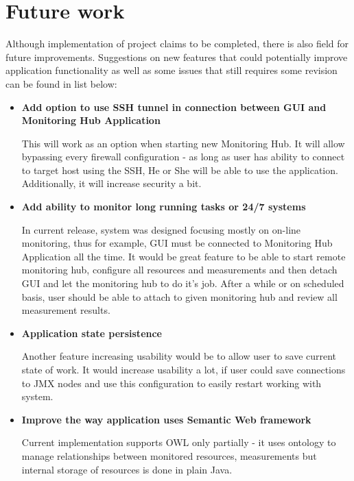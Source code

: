 %


\section{Future work}
\label{sec:ch8_future_work}
 
Although implementation of project claims to be completed, there is also field for future improvements. Suggestions on new features that could potentially improve application functionality as well as some issues that still requires some revision can be found in list below:

\begin{itemize}
 \item {\bf Add option to use SSH tunnel in connection between GUI and Monitoring Hub Application}
 
 This will work as an option when starting new Monitoring Hub. It will allow bypassing every firewall configuration - as long as user has ability to connect to target host using the SSH, He or She will be able to use the application. Additionally, it will increase security a bit.
 
\item {\bf Add ability to monitor long running tasks or 24/7 systems }  

In current release, system was designed focusing mostly on on-line monitoring, thus for example, GUI must be connected to Monitoring Hub Application all the time. It would be great feature to be able to start remote monitoring hub, configure all resources and measurements and then detach GUI and let the monitoring hub to do it\rq{}s job. After a while or on scheduled basis, user should be able to attach to given monitoring hub and review all measurement results.

\item {\bf Application state persistence }  

Another feature increasing usability would be to allow user to save current state of work. It would increase usability a lot, if user could save connections to JMX nodes and use this configuration to easily restart working with system. 

 \item {\bf Improve the way application uses Semantic Web framework} 
     
Current implementation supports OWL only partially - it uses ontology to manage relationships between monitored resources, measurements but internal storage of resources is done in plain Java.
          

\end{itemize}
